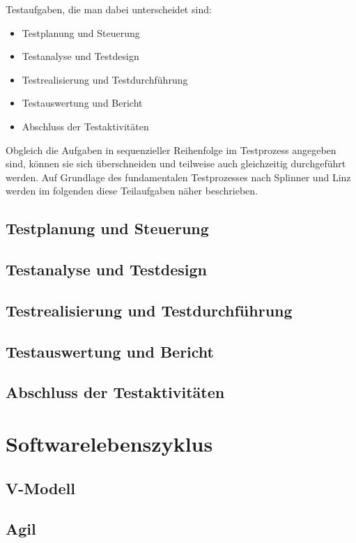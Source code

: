 Testaufgaben, die man dabei unterscheidet sind:

\begin{itemize}
	  \itemsep0pt
      \item Testplanung und Steuerung
      \item Testanalyse und Testdesign
      \item Testrealisierung und Testdurchführung
      \item Testauswertung und Bericht
      \item Abschluss der Testaktivitäten       
\end{itemize}

Obgleich die Aufgaben in sequenzieller Reihenfolge im Testprozess angegeben sind, können sie sich überschneiden und teilweise auch gleichzeitig durchgeführt werden. Auf Grundlage des fundamentalen Testprozesses nach Splinner und Linz werden im folgenden diese Teilaufgaben näher beschrieben. \cite[S.20ff]{spillner_basiswissen_2007}

\subsection{Testplanung und Steuerung}
\label{subsec:testplanung_und_steuerung}


\subsection{Testanalyse und Testdesign}
\label{subsec:testanalyse_und_design}


\subsection{Testrealisierung und Testdurchführung}
\label{subsec:testrealisierung_und_durchführung}

\subsection{Testauswertung und Bericht}
\label{subsec:testauswertung_und_bericht}


\subsection{Abschluss der Testaktivitäten}
\label{subsec:abschluss_der_testaktivitäten}



\section{Softwarelebenszyklus}
\label{sec:softwarelebenszyklus}



\subsection{V-Modell}
\label{subsec:vmodell}
\subsection{Agil}
\label{subsec:agil}

